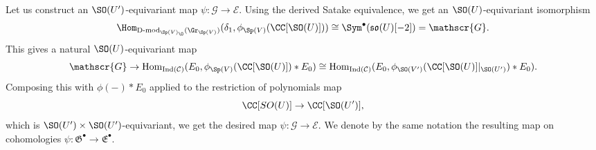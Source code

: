 \documentclass[11pt]{article}
\begin{document}
Let us construct an $\SO(U')$-equivariant map $\psi:\mathscr{G}\to \mathscr{E}$.
Using the derived Satake equivalence, we get an $\SO(U)$-equivariant isomorphism
$$\Hom_{\operatorname{D-mod}_{\Sp(V)_\O}(\Gr_{\Sp(V)})}(\delta_1, \phi_{\Sp(V)}(\CC[\SO(U)]))\cong \Sym^\bullet(\mathfrak{so}(U)[-2])=\mathscr{G}.$$
This gives a natural $\SO(U)$-equivariant map
$$\mathscr{G}\to \mathrm{Hom}_{\mathrm{Ind}(\mathcal{C})}(E_0, \phi_{\Sp(V)}(\CC[\SO(U)])* E_0)\cong \mathrm{Hom}_{\mathrm{Ind}(\mathcal{C})}(E_0, \phi_{\SO(V')}(\CC[\SO(U)]|_{\SO(U')})* E_0).$$
Composing this with $\phi(-)*E_0$ applied to the restriction of polynomials map $$\CC[SO(U)]\to \CC[\SO(U')],$$ which is $\SO(U')\times \SO(U')$-equivariant, we get the desired map $\psi:\mathscr{G}\to \mathscr{E}$. We denote by the same notation the resulting map on cohomologies $\psi:\mathfrak{G}^\bullet\to \mathfrak{E}^\bullet$.
\end{document}
